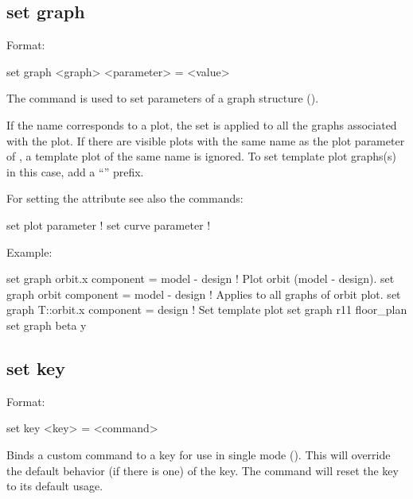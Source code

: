 {{{%

\subsection{set graph}
\label{s:set.graph}

Format:
\begin{example}
  set graph <graph> <parameter> = <value>
\end{example}

The  command is used to set parameters of a graph structure ().

If the  name corresponds to a plot, the set is applied to all the graphs associated with
the plot. If there are visible plots with the same name as the plot parameter of , a
template plot of the same name is ignored. To set template plot graphs(s) in this case, add a
``'' prefix.

For setting the  attribute see also the commands:
\begin{example}
  set plot parameter      ! 
  set curve parameter     ! 
\end{example}

Example:
\begin{example}
  set graph orbit.x component = model - design  ! Plot orbit (model - design).
  set graph orbit component = model - design    ! Applies to all graphs of orbit plot.
  set graph T::orbit.x component = design       ! Set template plot
  set graph r11 floor_plan%
  set graph beta y%
\end{example}


\subsection{set key}
\label{s:set.key}

Format:
\begin{example}
  set key <key> = <command>
\end{example}

Binds a custom command to a key for use in single mode ().  This will override the
default behavior (if there is one) of the key.  The command  will reset the key to its
default usage.

}}}

